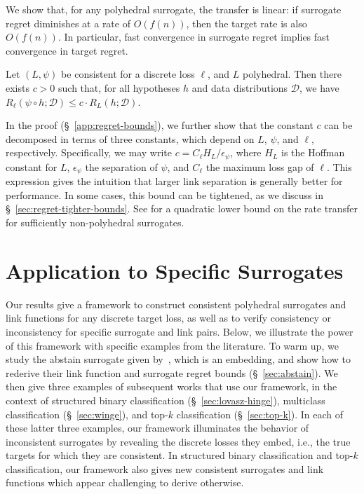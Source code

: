 \documentclass[twoside,11pt]{article}
\newcommand{\D}{\mathcal{D}}
\begin{document}
We show that, for any polyhedral surrogate, the transfer is linear: if surrogate regret diminishes at a rate of $O(f(n))$, then the target rate is also $O(f(n))$.
In particular, fast convergence in surrogate regret implies fast convergence in target regret.
\begin{theorem}
  \label{thm:linear-regret-bound}
  Let $(L,\psi)$ be consistent for a discrete loss $\ell$, and $L$ polyhedral.
  Then there exists $c > 0$ such that, for all hypotheses $h$ and data distributions $\D$, we have $R_{\ell}(\psi \circ h;\D) \leq c \cdot R_L(h;\D)$.
\end{theorem}
In the proof (\S~\ref{app:regret-bounds}), we further show that the constant $c$ can be decomposed in terms of three constants, which depend on $L$, $\psi$, and $\ell$, respectively.
Specifically, we may write $c = C_\ell H_L / \epsilon_\psi$, where $H_L$ is the Hoffman constant for $L$, $\epsilon_\psi$ the separation of $\psi$, and $C_\ell$ the maximum loss gap of $\ell$.
This expression gives the intuition that larger link separation is generally better for performance.
In some cases, this bound can be tightened, as we discuss in \S~\ref{sec:regret-tighter-bounds}.
See \citet{frongillo2021surrogate} for a quadratic lower bound on the rate transfer for sufficiently non-polyhedral surrogates.


\section{Application to Specific Surrogates}\label{sec:applications}

Our results give a framework to construct consistent polyhedral surrogates and link functions for any discrete target loss, as well as to verify consistency or inconsistency for specific surrogate and link pairs.
Below, we illustrate the power of this framework with specific examples from the literature.
To warm up, we study the abstain surrogate given by~\citet{ramaswamy2018consistent}, which is an embedding, and show how to rederive their link function and surrogate regret bounds (\S~\ref{sec:abstain}). 
We then give three examples of subsequent works that use our framework, in the context of structured binary classification (\S~\ref{sec:lovasz-hinge}), multiclass classification (\S~\ref{sec:winge}), and top-$k$ classification (\S~\ref{sec:top-k}).
In each of these latter three examples, our framework illuminates the behavior of inconsistent surrogates by revealing the discrete losses they embed, i.e., the true targets for which they are consistent.
In structured binary classification and top-$k$ classification, our framework also gives new consistent surrogates and link functions which appear challenging to derive otherwise.
\end{document}
